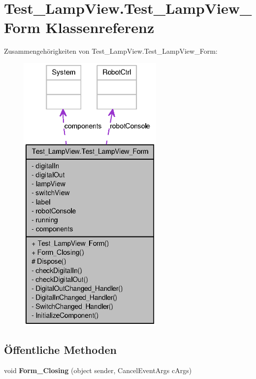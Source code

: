\hypertarget{class_test___lamp_view_1_1_test___lamp_view___form}{
\section{Test\_\-LampView.Test\_\-LampView\_\-Form Klassenreferenz}
\label{class_test___lamp_view_1_1_test___lamp_view___form}
}


Zusammengehörigkeiten von Test\_\-LampView.Test\_\-LampView\_\-Form:\nopagebreak
\begin{figure}[H]
\begin{center}
\leavevmode
\includegraphics[height=400pt]{class_test___lamp_view_1_1_test___lamp_view___form__coll__graph}
\end{center}
\end{figure}
\subsection*{Öffentliche Methoden}
\begin{DoxyCompactItemize}
\item 
\hypertarget{class_test___lamp_view_1_1_test___lamp_view___form_acea2549e6583c8a972c9c5befc70cb34}{
void {\bfseries Form\_\-Closing} (object sender, CancelEventArgs cArgs)}
\label{class_test___lamp_view_1_1_test___lamp_view___form_acea2549e6583c8a972c9c5befc70cb34}

\end{DoxyCompactItemize}
